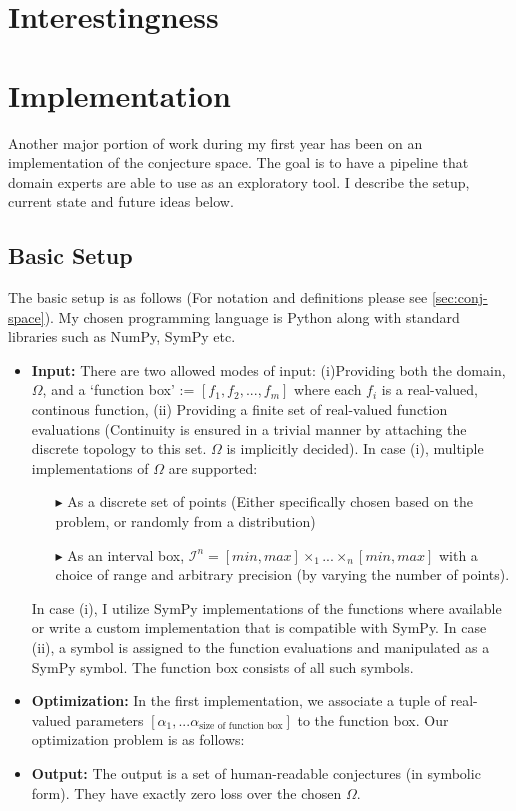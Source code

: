 \section{Interestingness}

\section{Implementation}
Another major portion of work during my first year has been on an implementation of the conjecture space. The goal is to have a pipeline that domain experts are able to use as an exploratory tool.
I describe the setup, current state and future ideas below.

\subsection{Basic Setup}
The basic setup is as follows (For notation and definitions please see \ref{sec:conj-space}). My chosen programming language is Python along with standard libraries such as NumPy, SymPy etc. 
\begin{itemize}
    \item \textbf{Input:} There are two allowed modes of input: (i)Providing both the domain, $\Omega$, and a `function box' := $[f_1, f_2,...,f_m]$ where each $f_i$ is a real-valued, continous function, (ii) Providing a finite set of real-valued function evaluations (Continuity is ensured in a trivial manner by attaching the discrete topology to this set. $\Omega$ is implicitly decided). In case (i), multiple implementations of $\Omega$ are supported: 
          \begin{itemize}
            \item[$\blacktriangleright$] As a discrete set of points (Either specifically chosen based on the problem, or randomly from a distribution)
            \item[$\blacktriangleright$] As an interval box, $\mathcal{I}^n = [min, max]\times_1...\times_n[min, max]$ with a choice of range and arbitrary precision (by varying the number of points).
          \end{itemize}
          In case (i), I utilize SymPy \cite{10.7717/peerj-cs.103} implementations of the functions where available or write a custom implementation that is compatible with SymPy. In case (ii), a symbol is assigned to the function evaluations and manipulated as a SymPy symbol. The function box consists of all such symbols.
    \item \textbf{Optimization:} In the first implementation, we associate a tuple of real-valued parameters $[\alpha_1,...\alpha_{\text{size of function box}}]$ to the function box. Our optimization problem is as follows:
    
    \item \textbf{Output:} The output is a set of human-readable conjectures (in symbolic form). They have exactly zero loss over the chosen $\Omega$.
    
\end{itemize}
 


